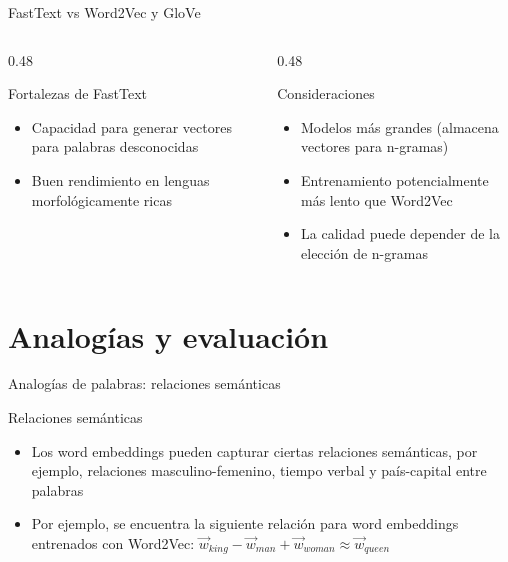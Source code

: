 \documentclass[handout]{beamer}
\begin{document}
\begin{frame}{FastText vs Word2Vec y GloVe}
  \begin{columns}[T]
      \begin{column}{0.48\textwidth}
          \begin{block}{Fortalezas de FastText}
              \begin{itemize}
                  \item Capacidad para generar vectores para palabras desconocidas
                  \item Buen rendimiento en lenguas morfológicamente ricas
              \end{itemize}
          \end{block}
      \end{column}
      \begin{column}{0.48\textwidth}
          \begin{block}{Consideraciones}
              \begin{itemize}
                  \item Modelos más grandes (almacena vectores para n-gramas)
                  \item Entrenamiento potencialmente más lento que Word2Vec
                  \item La calidad puede depender de la elección de n-gramas
              \end{itemize}
          \end{block}
      \end{column}
  \end{columns}
\end{frame}

\section{Analogías y evaluación}

\begin{frame}{Analogías de palabras: relaciones semánticas}
  \begin{block}{Relaciones semánticas}
    \begin{itemize}
      \item Los word embeddings pueden capturar ciertas relaciones semánticas, por ejemplo, relaciones masculino-femenino, tiempo verbal y país-capital entre palabras
      \item Por ejemplo, se encuentra la siguiente relación para word embeddings entrenados con Word2Vec: $\vec{w}_{king} - \vec{w}_{man} + \vec{w}_{woman} \approx \vec{w}_{queen}$
    \end{itemize}
  \end{block}
\end{frame}
\end{document}
